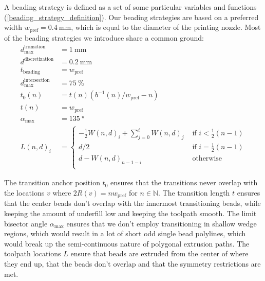 A beading strategy is defined as a set of some particular variables and functions (\cref{beading_strategy_definition}).
Our beading strategies are based on a preferred width $w_\text{pref} = \SI{0.4}{\milli\meter}$, which is equal to the diameter of the printing nozzle.
Most of the beading strategies we introduce share a common ground:
\begin{align*}
d_\text{max}^\text{transition} &= \SI{1}{\milli\meter} \\
d^\text{discretization} &= \SI{0.2}{\milli\meter} \\
t_\text{beading} &= w_\text{pref} \\
d_\text{max}^\text{intersection} &= \SI{75}{\percent} \\
%
t_0(n) &=  t(n) \left( b^{-1}(n) / w_\text{pref}  - n \right) \\
t(n) &= w_\text{pref} \\
\alpha_\text{max} &= \SI{135}{\degree} \\
L(n,d)_i &= 
\begin{cases}
-\frac12 W(n,d)_i + \sum_{j=0}^i W(n,d)_j & \text{ if } i < \frac12 (n -1) \\
d/2 & \text{ if } i =  \frac12 (n -1) \\
d - W(n,d)_{n-1-i} & \text{ otherwise }\\
\end{cases}
\end{align*}

The transition anchor position $t_0$ ensures that the transitions never overlap with the locations $v$ where $2 R(v) = n w_\text{pref}$ for $n \in \mathbb{N}$.
The transition length $t$ ensures that the center beads don't overlap with the innermost transitioning beads, while keeping the amount of underfill low and keeping the toolpath smooth.
The limit bisector angle $\alpha_\text{max}$ ensures that we don't employ transitioning in shallow wedge regions, which would result in a lot of short odd single bead polylines, which would break up the semi-continuous nature of polygonal extrusion paths.
The toolpath locations $L$ ensure that beads are extruded from the center of where they end up, that the beads don't overlap and that the symmetry restrictions are met.


